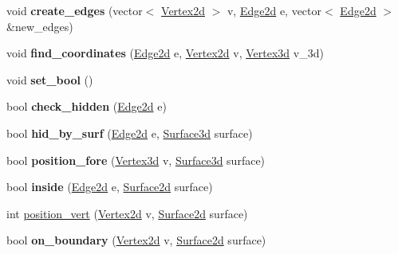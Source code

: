 \begin{DoxyCompactItemize}
\item 
void {\bfseries create\+\_\+edges} (vector$<$ \hyperlink{classVertex2d}{Vertex2d} $>$ v, \hyperlink{classEdge2d}{Edge2d} e, vector$<$ \hyperlink{classEdge2d}{Edge2d} $>$ \&new\+\_\+edges)\hypertarget{classprojection_af4a7703ffcb0d8065161599fc0a53a0a}{}\label{classprojection_af4a7703ffcb0d8065161599fc0a53a0a}

\item 
void {\bfseries find\+\_\+coordinates} (\hyperlink{classEdge2d}{Edge2d} e, \hyperlink{classVertex2d}{Vertex2d} v, \hyperlink{classVertex3d}{Vertex3d} v\+\_\+3d)\hypertarget{classprojection_a5ed8afe4b9ddb6934964099ac8672d08}{}\label{classprojection_a5ed8afe4b9ddb6934964099ac8672d08}

\item 
void {\bfseries set\+\_\+bool} ()\hypertarget{classprojection_a309fd47b2fe6db11791c66b9109cb72f}{}\label{classprojection_a309fd47b2fe6db11791c66b9109cb72f}

\item 
bool {\bfseries check\+\_\+hidden} (\hyperlink{classEdge2d}{Edge2d} e)\hypertarget{classprojection_a9a39c01140c7f0a850a3399413f96d88}{}\label{classprojection_a9a39c01140c7f0a850a3399413f96d88}

\item 
bool {\bfseries hid\+\_\+by\+\_\+surf} (\hyperlink{classEdge2d}{Edge2d} e, \hyperlink{classSurface3d}{Surface3d} surface)\hypertarget{classprojection_a3f423bca7add8a35708563b4bdd9c91e}{}\label{classprojection_a3f423bca7add8a35708563b4bdd9c91e}

\item 
bool {\bfseries position\+\_\+fore} (\hyperlink{classVertex3d}{Vertex3d} v, \hyperlink{classSurface3d}{Surface3d} surface)\hypertarget{classprojection_adae33f33917c169cb26a30083fc5f362}{}\label{classprojection_adae33f33917c169cb26a30083fc5f362}

\item 
bool {\bfseries inside} (\hyperlink{classEdge2d}{Edge2d} e, \hyperlink{classSurface2d}{Surface2d} surface)\hypertarget{classprojection_a4800ad8659761e94c9361c8b0687716e}{}\label{classprojection_a4800ad8659761e94c9361c8b0687716e}

\item 
int \hyperlink{classprojection_a1472f7b496d0d3d12eed1445e970cde9}{position\+\_\+vert} (\hyperlink{classVertex2d}{Vertex2d} v, \hyperlink{classSurface2d}{Surface2d} surface)
\item 
bool {\bfseries on\+\_\+boundary} (\hyperlink{classVertex2d}{Vertex2d} v, \hyperlink{classSurface2d}{Surface2d} surface)\hypertarget{classprojection_a99d8290040437f3b902c27772176da5d}{}\label{classprojection_a99d8290040437f3b902c27772176da5d}


\end{DoxyCompactItemize}
